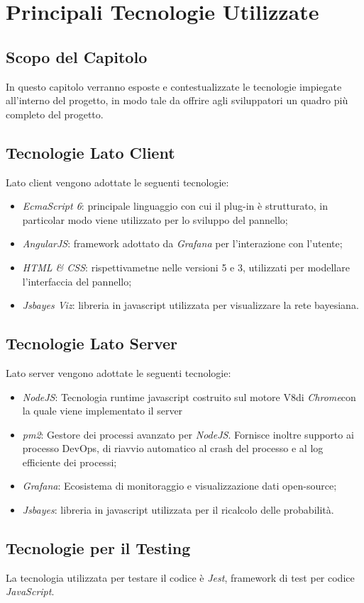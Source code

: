 \section{Principali Tecnologie Utilizzate}\label{tecnologie}
\subsection{Scopo del Capitolo}
In questo capitolo verranno esposte e contestualizzate le tecnologie impiegate all'interno del progetto, in modo tale da offrire agli sviluppatori un quadro più completo del progetto.

\subsection{Tecnologie Lato Client}\label{clientTec}
Lato client vengono adottate le seguenti tecnologie:
\begin{itemize}
	\item \textit{EcmaScript 6}: principale linguaggio con cui il plug-in è strutturato, in particolar modo viene utilizzato per lo sviluppo del pannello;
	\item \textit{AngularJS}: framework adottato da \textit{Grafana} per l'interazione con l'utente;
	\item \textit{HTML \& CSS}: rispettivametne nelle versioni 5 e 3, utilizzati per modellare l'interfaccia del pannello;
	\item \textit{Jsbayes Viz}: libreria in javascript utilizzata per visualizzare la rete bayesiana.
\end{itemize}

\subsection{Tecnologie Lato Server}\label{serverTec}
Lato server vengono adottate le seguenti tecnologie:
\begin{itemize}
	\item \textit{NodeJS}: Tecnologia runtime javascript costruito sul motore V8\glossario di \textit{Chrome}\glossario con la quale viene implementato il server 
	\item \textit{pm2}: Gestore dei processi avanzato per \textit{NodeJS}. Fornisce inoltre supporto ai processo DevOps\glossario , di riavvio automatico al crash del processo e al log efficiente dei processi;
	\item \textit{Grafana}: Ecosistema di monitoraggio e visualizzazione dati open-source;
	\item \textit{Jsbayes}: libreria in javascript utilizzata per il ricalcolo delle probabilità.
\end{itemize}

\subsection{Tecnologie per il Testing}\label{testTec}
La tecnologia utilizzata per testare il codice è \textit{Jest}, framework di test per codice \textit{JavaScript}.